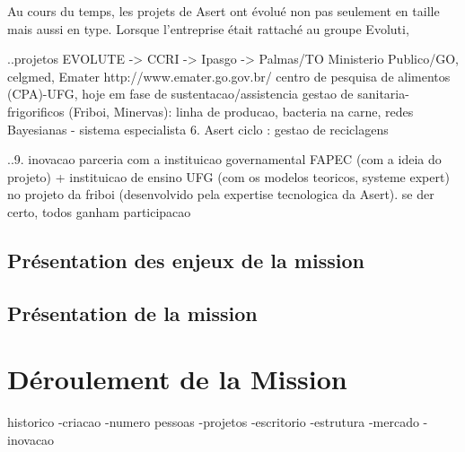 Au cours du temps, les projets de Asert ont évolué non pas seulement en taille mais aussi en type. Lorsque l'entreprise était rattaché au groupe Evoluti, 



..projetos EVOLUTE -> CCRI -> Ipasgo -> Palmas/TO 
	Ministerio Publico/GO, celgmed, Emater http://www.emater.go.gov.br/
	centro de pesquisa de alimentos (CPA)-UFG, hoje em fase de sustentacao/assistencia
	gestao de sanitaria-frigorificos (Friboi, Minervas): linha de producao, bacteria na carne, redes Bayesianas - sistema especialista
6. Asert ciclo : gestao de reciclagens


..9. inovacao
	parceria com a instituicao governamental FAPEC (com a ideia do projeto) + instituicao de ensino UFG (com os modelos teoricos, systeme expert) no projeto da friboi (desenvolvido pela expertise tecnologica da Asert). se der certo, todos ganham participacao


\section{Présentation des enjeux de la mission}
\section{Présentation de la mission}
\chapter{Déroulement de la Mission}



historico
-criacao
-numero pessoas
-projetos
-escritorio
-estrutura
-mercado
-inovacao

